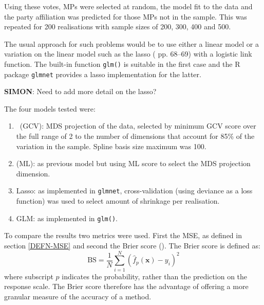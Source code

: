 Using these votes, MPs were selected at random, the model fit to the data and the party affiliation was predicted for those MPs not in the sample. This was repeated for 200 realisations with sample sizes of 200, 300, 400 and 500.

The usual approach for such problems would be to use either a linear model or a variation on the linear model such as the lasso (\cite{elements} pp. 68--69) with a logistic link function. The built-in function \texttt{glm()} is suitable in the first case and the \textsf{R} package \texttt{glmnet} provides a lasso implementation for the latter.

\textbf{SIMON}: Need to add more detail on the lasso?

The four models tested were:

\begin{enumerate}
	\item \mdsds\ (GCV): MDS projection of the data, selected by minimum GCV score over the full range of 2 to the number of dimensions that account for 85\% of the variation in the sample. Spline basis size maximum was 100.
	\item \mdsds\: (ML): as previous model but using ML score to select the MDS projection dimension. 
	\item Lasso: as implemented in \texttt{glmnet}, cross-validation (using deviance as a loss function) was used to select amount of shrinkage per realisation.
	\item GLM: as implemented in \texttt{glm()}.
\end{enumerate}

To compare the results two metrics were used. First the MSE, as defined in section \ref{DEFN-MSE} and second the Brier score (\cite{brier50}). The Brier score is defined as:
\begin{equation}
\text{BS} = \frac{1}{N} \sum_{i=1}^N (\hat{f}_p(\mathbf{x})-y_i)^2
\end{equation}
where subscript $p$ indicates the probability, rather than the prediction on the response scale. The Brier score therefore has the advantage of offering a more granular measure of the accuracy of a method.

